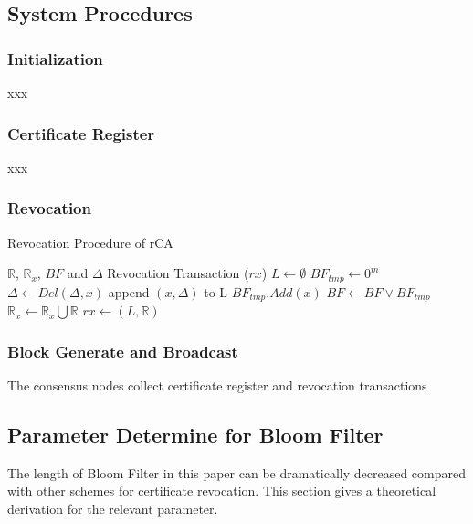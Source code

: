 \documentclass[conference]{IEEEtran}
\begin{document}
\subsection{System Procedures}
\subsubsection{Initialization}
xxx

\subsubsection{Certificate Register}
xxx


\subsubsection{Revocation}

\begin{algorithm}
\renewcommand{\algorithmicensure}{\textbf{Output:}}
	\caption{Revocation Procedure of rCA}\label{alg:cap}
	\begin{algorithmic}[1]
		\Require $\mathbb{R}$, $\mathbb{R}_x$, $BF$ and $\Delta$ %
		\Ensure Revocation Transaction ($rx$)
		\State $L\gets \emptyset$
		\State $BF_{tmp} \gets 0^m$ 
		\State $\Delta \gets Del(\Delta, x)$ 
		\State append $(x, \Delta)$ to L
		\Else
		\State $BF_{tmp}.Add(x)$
		\EndIf
		\EndFor
		\State $BF \gets BF \lor BF_{tmp}$
		\State $\mathbb{R}_x \gets \mathbb{R}_x \bigcup \mathbb{R} $
		\State $rx \gets (L, \mathbb{R})$
	\end{algorithmic}
\end{algorithm}

\subsubsection{Block Generate and Broadcast}
The consensus nodes collect certificate register and revocation transactions 
\subsection{Parameter Determine for Bloom Filter} \label{section:parameter}

The length of Bloom Filter in this paper can be dramatically decreased compared with other schemes for certificate revocation. This section gives a theoretical derivation for the relevant parameter.
\end{document}
